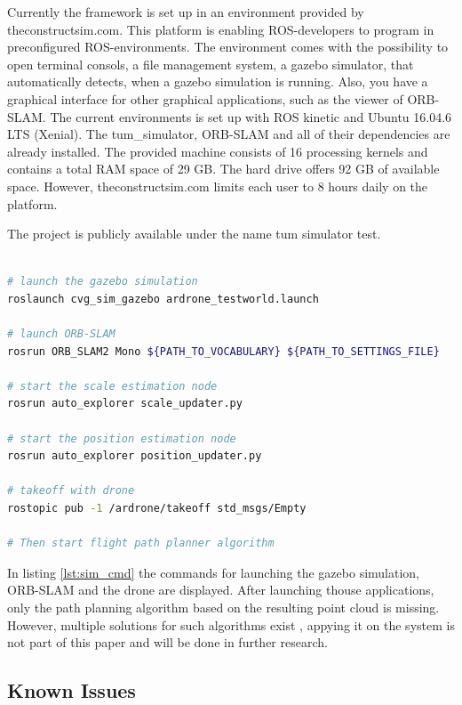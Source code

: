 	Currently the framework is set up in an environment provided by theconstructsim.com. This platform is enabling ROS-developers to program in preconfigured
	ROS-environments. The environment comes with the possibility to open terminal consols, a file management system, a gazebo simulator, that automatically 
	detects, when a gazebo simulation is running. Also, you have a graphical interface for other graphical applications, such as the viewer of ORB-SLAM.
	The current environments is set up with ROS kinetic and Ubuntu 16.04.6 LTS (Xenial). The tum\_simulator, ORB-SLAM and all of their dependencies are already installed. 
	The provided machine consists of 16 processing kernels and contains a total RAM space of 29 GB.  The hard drive offers 92 GB of available space. However, 
	theconstructsim.com limits each user to 8 hours daily on the platform. 
	
	The project is publicly available under the name tum simulator test.
	
	\begin{lstlisting}[language=bash, caption=Launching the simulated environment, label=lst:sim_cmd]
	
# launch the gazebo simulation
roslaunch cvg_sim_gazebo ardrone_testworld.launch
	
# launch ORB-SLAM
rosrun ORB_SLAM2 Mono ${PATH_TO_VOCABULARY} ${PATH_TO_SETTINGS_FILE}

# start the scale estimation node
rosrun auto_explorer scale_updater.py

# start the position estimation node
rosrun auto_explorer position_updater.py
	
# takeoff with drone 
rostopic pub -1 /ardrone/takeoff std_msgs/Empty

# Then start flight path planner algorithm

	\end{lstlisting}
	
	In listing \ref{lst:sim_cmd} the commands for launching the gazebo simulation, ORB-SLAM and the drone are displayed. After launching thouse 
	applications, only the path planning algorithm based on the resulting point cloud is missing. However, multiple solutions for such algorithms 
	exist \cite{path}, appying it on the system is not part of this paper and will be done in further research. 

	\subsection{Known Issues}
	
